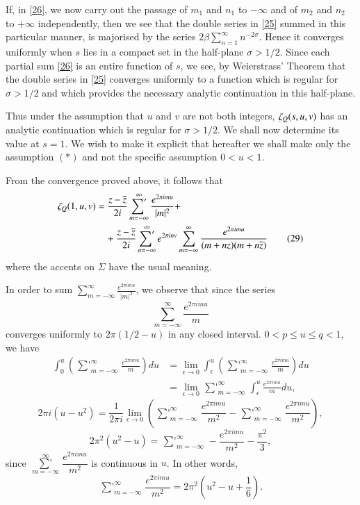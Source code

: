 If, in \eqref{26}, we now carry out the passage of $m_{1}$ and $n_{1}$
to $-\infty$ and of $m_{2}$ and $n_{2}$ to $+\infty$ independently,
then we see that the double series in \eqref{25} summed in this
particular manner, is majorised by the series $2\beta
\sum\limits^{\infty}_{n=1}n^{-2\sigma}$. Hence it converges uniformly
when $s$ lies in a compact set in the half-plane $\sigma>1/2$. Since
each partial sum \eqref{26} is an entire function of $s$, we see, by
Weierstrass' Theorem that the double series in \eqref{25} converges
uniformly to a function which is regular for $\sigma>1/2$ and which
provides the necessary analytic continuation in this half-plane.

Thus under the assumption that $u$ and $v$ are not both integers,
$\zeta_{Q}(s,\break u,v)$ has an analytic continuation which is regular for
$\sigma>1/2$. We shall now determine its value at $s=1$. We wish to
make it explicit that hereafter we shall make only the assumption
$(\ast)$ and not the specific assumption $0<u<1$.

From the convergence proved above, it follows that
\begin{align*}
\zeta_{Q}(1,u,v) &=
\frac{z-\overline{z}}{2i}\mathop{{\sum}'}^{\infty}_{m=-\infty}\frac{e^{2\pi
    imu}}{|m|^{2}}+\\ 
&\quad
+\frac{z-\overline{z}}{2i}\mathop{{\sum}'}^{\infty}_{n=-\infty}e^{2\pi
  inv}\sum^{\infty}_{m=-\infty}\frac{e^{2\pi
    imu}}{(m+nz)(m+n\overline{z})}\tag{29}\label{29} 
\end{align*} 
where the accents on $\Sigma$ have the usual meaning.

In order to sum $\sum\limits^{\infty}_{m=-\infty}\frac{e^{2\pi
    imu}}{|m|^{2}}$, we observe that since the series
$$\sum\limits^{\infty}_{m=-\infty}\frac{e^{2\pi
    imu}}{m}$$\pageoriginale 
converges uniformly to $2\pi(1/2-u)$ in
any closed interval. $0<p\leq u\leq q<1$, we have
\begin{align*}
\int^{u}_{0}\left(\mathop{{\sum}'}^{\infty}_{m=-\infty}\frac{e^{2\pi
    imu}}{m}\right)du &= \lim\limits_{\epsilon\to
  0}\int^{u}_{\epsilon}\left(\mathop{{\sum}'}^{\infty}_{m=-\infty}\frac{e^{2\pi
    imu}}{m}\right)du\\
&= \lim\limits_{\epsilon\to
  0}\mathop{{\sum}'}^{\infty}_{m=-\infty}\int^{u}_{\epsilon}\frac{e^{2\pi
    imu}}{m}du, 
\end{align*}
\ie
$$
2\pi i(u-u^{2})=\frac{1}{2\pi i}\lim\limits_{\epsilon\to
  0}\left(\mathop{{\sum}'}^{\infty}_{m=-\infty}\frac{e^{2\pi
    imu}}{m^{2}}-\mathop{{\sum}'}^{\infty}_{m=-\infty}\frac{e^{2\pi
    imu}}{m^{2}}\right),
$$
\ie
$$
2\pi^{2}(u^{2}-u)=\mathop{{\sum}'}^{\infty}_{m=-\infty}-\frac{e^{2\pi
    imu}}{m^{2}}-\frac{\pi^{2}}{3}, 
$$
since $\mathop{{\sum}'}\limits^{\infty}_{m=-\infty}\dfrac{e^{2\pi
    imu}}{m^{2}}$ is continuous in $u$. In other words,
$$
\mathop{{\sum}'}^{\infty}_{m=-\infty}\frac{e^{2\pi
    imu}}{m^{2}}=2\pi^{2}\left(u^{2}-u+\frac{1}{6}\right). 
$$

